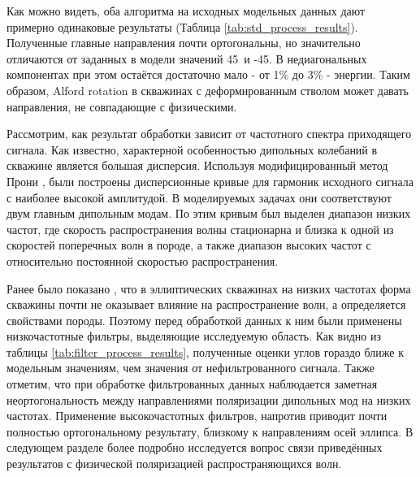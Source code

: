 \documentclass[a4paper,11pt]{article}
\begin{document}
Как можно видеть, оба алгоритма на исходных модельных данных дают примерно одинаковые результаты (Таблица \ref{tab:std_process_results}). Полученные главные направления почти ортогональны, но значительно отличаются от заданных в модели значений 45\textdegree \ и -45\textdegree. В недиагональных компонентах при этом остаётся достаточно мало - от 1\% до 3\% - энергии. Таким образом, Alford rotation в скважинах с деформированным стволом может давать направления, не совпадающие с физическими.

Рассмотрим, как результат обработки зависит от частотного спектра приходящего сигнала. Как известно, характерной особенностью дипольных колебаний в скважине является большая дисперсия. Используя модифицированный метод Прони \cite{Ekstrom1995}, были построены дисперсионные кривые для гармоник исходного сигнала с наиболее высокой амплитудой. В моделируемых задачах они соответствуют двум главным дипольным модам. %
По этим кривым был выделен диапазон низких частот, где скорость распространения волны стационарна и близка к одной из скоростей поперечных волн в породе, а также диапазон высоких частот с относительно постоянной скоростью распространения. 

Ранее было показано \cite{Seroices2010}, что в эллиптических скважинах на низких частотах форма скважины почти не оказывает влияние на распространение волн, а определяется свойствами породы. Поэтому перед обработкой данных к ним были применены низкочастотные фильтры, выделяющие исследуемую область. Как видно из таблицы \ref{tab:filter_process_results}, полученные оценки углов гораздо ближе к модельным значениям, чем значения от нефильтрованного сигнала. Также отметим, что при обработке фильтрованных данных наблюдается заметная неортогональность между направлениями поляризации дипольных мод на низких частотах. Применение высокочастотных фильтров, напротив приводит почти полностью ортогональному результату, близкому к направлениям осей эллипса. В следующем разделе более подробно исследуется вопрос связи приведённых результатов с физической поляризацией распространяющихся волн.
\end{document}
